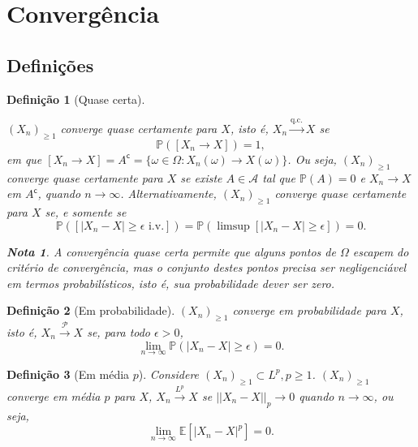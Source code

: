 \documentclass[12pt,a4paper,answers]{article}
\numberwithin{equation}{section} %
\newcommand{\cp}[1]{#1^\mathsf{c}} %
\renewcommand{\P}{\mathbb{P}}
\newcommand{\E}{\mathbb{E}}
\newcommand{\Acal}{\mathcal{A}}
\theoremstyle{thm_estilo}
\newtheorem{definition}{Definição}[section]
\theoremstyle{thm_note_est}
\newtheorem*{note}{Nota}
\begin{document}
\section{Convergência}

\subsection{Definições}

\begin{definition}[Quase certa]
	\leavevmode
	\begin{outline}
		\1 $(X_n)_{\geq1}$ converge quase certamente para $X$, isto é, $X_n \xrightarrow{\text{q.c.}} X$ se
		\begin{equation}
			\P([X_n\to X])=1,
		\end{equation}
		em que $[X_n \to X] = \cp{A} = \{\omega \in \Omega: X_n(\omega) \to X(\omega) \}$.
		\1 Ou seja, $(X_n)_{\geq1}$ converge quase certamente para $X$ se existe $A\in\Acal$ tal que $\P(A)=0$ e $X_n\to X$ em $\cp{A}$, quando $n\to\infty$.
		\1  Alternativamente, $(X_n)_{\geq1}$ converge quase certamente para $X$ se, e somente se
		\begin{equation}
			\P([|X_n-X|\geq \epsilon \text{ i.v.}])= \P(\limsup[|X_n-X|\geq\epsilon])= 0.
		\end{equation}
	\end{outline}
	\begin{note}
		A convergência quase certa permite que alguns pontos de $\Omega$ escapem do critério de convergência, mas o conjunto destes pontos precisa ser negligenciável em termos probabilísticos, isto é, sua probabilidade dever ser zero.  
	\end{note}
	
\end{definition}

\begin{definition}[Em probabilidade]
	$(X_n)_{\geq1}$ converge em probabilidade para $X$, isto é, $X_n \xrightarrow{\mathcal{P}} X$ se, para todo $\epsilon>0$,
	\begin{equation}
		\lim\limits_{n\to\infty}\P(|X_n-X|\geq\epsilon)=0.
	\end{equation}
\end{definition}

\begin{definition}[Em média $p$]
	Considere $(X_n)_{\geq1} \subset L^p, p\geq1$. $(X_n)_{\geq1}$ converge em média $p$ para $X$, $X_n \xrightarrow{L ^p} X$ se $|| X_n-X ||_p\to 0$ quando $n\to\infty$, ou seja,
	\begin{equation}
		\lim\limits_{n\to\infty}\E[|X_n-X|^p]=0.
	\end{equation}
\end{definition}
\end{document}
